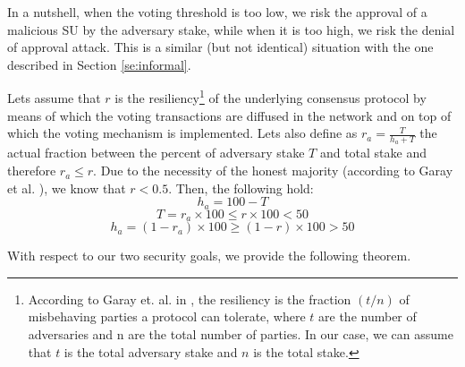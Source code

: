 In a nutshell, when the voting threshold is too low, we risk the approval of a malicious SU by the adversary stake, while when it is too high, we risk the denial of approval attack. This is a similar (but not identical) situation with the one described in Section \ref{se:informal}.

Lets assume that $r$ is the resiliency\footnote{According to Garay et. al. in \cite{sok}, the resiliency is the fraction $(t/n)$ of misbehaving parties a protocol can tolerate, where $t$ are the number of adversaries and n are the total number of parties. In our case, we can assume that $t$ is the total adversary stake and $n$ is the total stake.} of the underlying consensus protocol by means of which the voting transactions are diffused in the network and on top of which the voting mechanism is implemented. Lets also define as $r_a = \frac{T}{h_a+T}$ the actual fraction between the percent of adversary stake $T$ and total stake and therefore $r_a \leq r$. Due to the necessity of the honest majority (according to Garay et al. \cite{sok}), we know that $r < 0.5$. Then, 
 the following hold:
\begin{equation} \label{eq1}
h_a = 100 -T
\end{equation}
\begin{equation} \label{eq2}
T = r_a \times 100 \leq r \times 100 < 50
\end{equation}
\begin{equation} \label{eq3}
h_a = (1-r_a) \times 100 \geq (1-r)\times 100 > 50
\end{equation}

With respect to our two security goals, we provide the following theorem.

